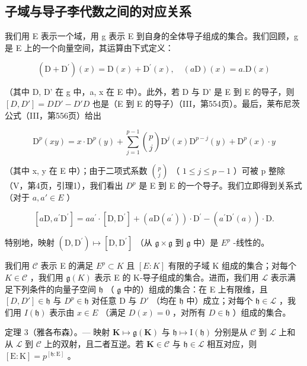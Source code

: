 \subsection{子域与导子李代数之间的对应关系}

我们用 E 表示一个域，用 g 表示 E 到自身的全体导子组成的集合。我们回顾，g 是 E 上的一个向量空间，其运算由下式定义：

\[
\left(\mathrm{D} + \mathrm{D} ^ {\prime}\right) (x) = \mathrm{D} (x) + \mathrm{D} ^ {\prime} (x), \quad (a \mathrm{D}) (x) = a. \mathrm{D} (x)\tag{6}
\]

（其中 D, D' 在 g 中，a, x 在 E 中）。此外，若 D 与 D' 是 E 到 E 的导子，则 \([D, D'] = DD' - D'D\) 也是（E 到 E 的导子）（III，第554页）。最后，莱布尼茨公式（III，第556页）给出

\[
\mathrm{D} ^ {p} (x y) = x \cdot \mathrm{D} ^ {p} (y) + \sum_ {j = 1} ^ {p - 1} \binom {p} {j} \mathrm{D} ^ {j} (x) \mathrm{D} ^ {p - j} (y) + \mathrm{D} ^ {p} (x) \cdot y
\]

（其中 x, y 在 E 中）；由于二项式系数 \(\binom{p}{j}\) （ \(1 \leqslant j \leqslant p - 1\) ）可被 p 整除（V，第4页，引理1），我们看出 \(D^{p}\) 是 E 到 E 的一个导子。我们立即得到关系式（对于 \(a, a' \in E\) ）

\[
\left[ a \mathrm{D}, a ^ {\prime} \mathrm{D} ^ {\prime} \right] = a a ^ {\prime} \cdot \left[ \mathrm{D}, \mathrm{D} ^ {\prime} \right] + \left(a \mathrm{D} \left(a ^ {\prime}\right)\right) \cdot \mathrm{D} ^ {\prime} - \left(a ^ {\prime} \mathrm{D} ^ {\prime} (a)\right) \cdot \mathrm{D}.\tag{7}
\]

特别地，映射 \((\mathrm{D},\mathrm{D}^{\prime})\mapsto [\mathrm{D},\mathrm{D}^{\prime}]\) （从 \(\mathfrak{g}\times \mathfrak{g}\) 到 \(\mathfrak{g}\) 中）是 \(E^p\) -线性的。

我们用 \(\mathcal{C}\) 表示 E 的满足 \(E^p \subset K\) 且 \([E:K]\) 有限的子域 K 组成的集合；对每个 \(K \in \mathcal{C}\) ，我们用 \(\mathfrak{g}(K)\) 表示 E 的 K-导子组成的集合。进而，我们用 \(\mathcal{L}\) 表示满足下列条件的向量子空间 \(\mathfrak{h}\) （ \(\mathfrak{g}\) 中的）组成的集合：在 E 上有限维，且 \([D,D'] \in \mathfrak{h}\) 与 \(D^p \in \mathfrak{h}\) 对任意 D 与 \(D'\) （均在 \(\mathfrak{h}\) 中）成立；对每个 \(\mathfrak{h} \in \mathcal{L}\) ，我们用 \(I(\mathfrak{h})\) 表示由 \(x \in E\) （满足 \(D(x) = 0\) ，对所有 \(D \in \mathfrak{h}\) ）组成的集合。

定理 3（雅各布森）。--- 映射 \(\mathbf{K} \mapsto \mathfrak{g}(\mathbf{K})\) 与 \(\mathfrak{h} \mapsto \mathrm{I}(\mathfrak{h})\) 分别是从 \(\mathcal{C}\) 到 \(\mathcal{L}\) 上和从 \(\mathcal{L}\) 到 \(\mathcal{C}\) 上的双射，且二者互逆。若 \(\mathbf{K} \in \mathcal{C}\) 与 \(\mathfrak{h} \in \mathcal{L}\) 相互对应，则 \([\mathrm{E}:\mathrm{K}] = p^{[\mathfrak{h}:\mathrm{E}]}\) 。

